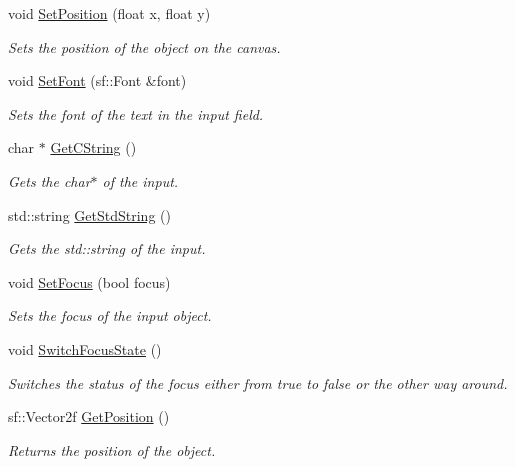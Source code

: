 \begin{DoxyCompactItemize}
void \mbox{\hyperlink{class_game_objects_1_1_input_field_a6debb6685c52c38129ea39fb3046d3fe}{Set\+Position}} (float x, float y)
\begin{DoxyCompactList}\small\item\em Sets the position of the object on the canvas. \end{DoxyCompactList}\item 
void \mbox{\hyperlink{class_game_objects_1_1_input_field_accc12efd2237909cd33e32c51cd4002d}{Set\+Font}} (sf\+::\+Font \&font)
\begin{DoxyCompactList}\small\item\em Sets the font of the text in the input field. \end{DoxyCompactList}\item 
char $\ast$ \mbox{\hyperlink{class_game_objects_1_1_input_field_a3c18942b479df89b20f2c25001fe3b8a}{Get\+C\+String}} ()
\begin{DoxyCompactList}\small\item\em Gets the char$\ast$ of the input. \end{DoxyCompactList}\item 
std\+::string \mbox{\hyperlink{class_game_objects_1_1_input_field_a4c67555be1e560afc7974a14e2565c56}{Get\+Std\+String}} ()
\begin{DoxyCompactList}\small\item\em Gets the std\+::string of the input. \end{DoxyCompactList}\item 
void \mbox{\hyperlink{class_game_objects_1_1_input_field_af080e30d13ad74e8e58b17142c0dff0b}{Set\+Focus}} (bool focus)
\begin{DoxyCompactList}\small\item\em Sets the focus of the input object. \end{DoxyCompactList}\item 
void \mbox{\hyperlink{class_game_objects_1_1_input_field_ab0e12850c9da42c7de085e8c73dd8de1}{Switch\+Focus\+State}} ()
\begin{DoxyCompactList}\small\item\em Switches the status of the focus either from true to false or the other way around. \end{DoxyCompactList}\item 
sf\+::\+Vector2f \mbox{\hyperlink{class_game_objects_1_1_input_field_a24c8b48b7311a4bf6112359c5a0d50c6}{Get\+Position}} ()
\begin{DoxyCompactList}\small\item\em Returns the position of the object. \end{DoxyCompactList}\item 

\end{DoxyCompactItemize}
